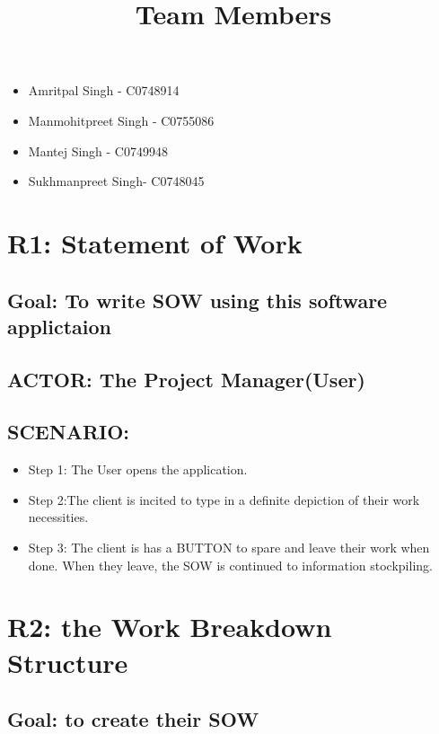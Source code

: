 \documentclass[10pt]{article}
\begin{document}
\title*{Team Members}

\begin{itemize}

\item Amritpal Singh - C0748914
\item Manmohitpreet Singh - C0755086
\item Mantej Singh - C0749948
\item Sukhmanpreet Singh- C0748045

\end{itemize}



\section{ R1: Statement of Work  }

\subsection{Goal:   To write SOW using this software applictaion}


\subsection{ACTOR: The Project Manager(User)}

\subsection{SCENARIO: }

\begin{itemize}

  \item Step 1: The User opens the application.

  \item Step 2:The client is incited to type in a definite depiction of their work necessities.

  \item Step 3: The client is has a BUTTON to spare and leave their work when done. When they leave, the SOW is continued to information stockpiling.

\end{itemize}


\section{ R2: the Work Breakdown Structure  }

\subsection{Goal:  to create their SOW}
\end{document}
